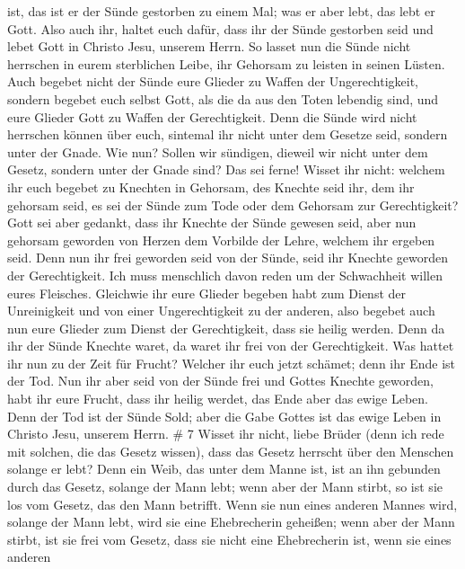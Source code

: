 ist, das ist er der Sünde gestorben zu einem Mal; was er aber lebt, das
lebt er Gott.  Also auch ihr, haltet euch dafür, dass ihr
der Sünde gestorben seid und lebet Gott in Christo Jesu, unserem Herrn.
 So lasset nun die Sünde nicht herrschen in eurem
sterblichen Leibe, ihr Gehorsam zu leisten in seinen Lüsten.
 Auch begebet nicht der Sünde eure Glieder zu Waffen der
Ungerechtigkeit, sondern begebet euch selbst Gott, als die da aus den
Toten lebendig sind, und eure Glieder Gott zu Waffen der Gerechtigkeit.
 Denn die Sünde wird nicht herrschen können über euch,
sintemal ihr nicht unter dem Gesetze seid, sondern unter der Gnade.
 Wie nun? Sollen wir sündigen, dieweil wir nicht unter dem
Gesetz, sondern unter der Gnade sind? Das sei ferne! 
Wisset ihr nicht: welchem ihr euch begebet zu Knechten in Gehorsam, des
Knechte seid ihr, dem ihr gehorsam seid, es sei der Sünde zum Tode oder
dem Gehorsam zur Gerechtigkeit?  Gott sei aber gedankt,
dass ihr Knechte der Sünde gewesen seid, aber nun gehorsam geworden von
Herzen dem Vorbilde der Lehre, welchem ihr ergeben seid. 
Denn nun ihr frei geworden seid von der Sünde, seid ihr Knechte geworden
der Gerechtigkeit.  Ich muss menschlich davon reden um der
Schwachheit willen eures Fleisches. Gleichwie ihr eure Glieder begeben
habt zum Dienst der Unreinigkeit und von einer Ungerechtigkeit zu der
anderen, also begebet auch nun eure Glieder zum Dienst der
Gerechtigkeit, dass sie heilig werden.  Denn da ihr der
Sünde Knechte waret, da waret ihr frei von der Gerechtigkeit.
 Was hattet ihr nun zu der Zeit für Frucht? Welcher ihr
euch jetzt schämet; denn ihr Ende ist der Tod.  Nun ihr
aber seid von der Sünde frei und Gottes Knechte geworden, habt ihr eure
Frucht, dass ihr heilig werdet, das Ende aber das ewige Leben.
 Denn der Tod ist der Sünde Sold; aber die Gabe Gottes ist
das ewige Leben in Christo Jesu, unserem Herrn. \# 7  Wisset
ihr nicht, liebe Brüder (denn ich rede mit solchen, die das Gesetz
wissen), dass das Gesetz herrscht über den Menschen solange er lebt?
 Denn ein Weib, das unter dem Manne ist, ist an ihn gebunden
durch das Gesetz, solange der Mann lebt; wenn aber der Mann stirbt, so
ist sie los vom Gesetz, das den Mann betrifft.  Wenn sie nun
eines anderen Mannes wird, solange der Mann lebt, wird sie eine
Ehebrecherin geheißen; wenn aber der Mann stirbt, ist sie frei vom
Gesetz, dass sie nicht eine Ehebrecherin ist, wenn sie eines anderen
